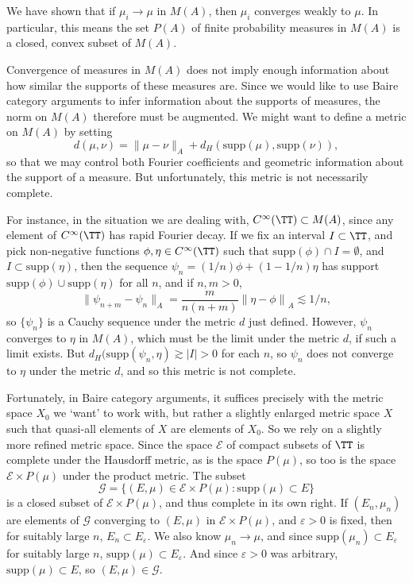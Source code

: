 \begin{remark}
	We have shown that if $\mu_i \to \mu$ in $M(A)$, then $\mu_i$ converges weakly to $\mu$. In particular, this means the set $P(A)$ of finite probability measures in $M(A)$ is a closed, convex subset of $M(A)$.
\end{remark}

Convergence of measures in $M(A)$ does not imply enough information about how similar the supports of these measures are. Since we would like to use Baire category arguments to infer information about the supports of measures, the norm on $M(A)$ therefore must be augmented. We might want to define a metric on $M(A)$ by setting
%
\[ d(\mu,\nu) = \| \mu - \nu \|_A + d_H(\text{supp}(\mu), \text{supp}(\nu)), \]
%
so that we may control both Fourier coefficients and geometric information about the support of a measure. But unfortunately, this metric is not necessarily complete.

\begin{example}
	For instance, in the situation we are dealing with, $C^\infty(\TT) \subset M(A)$, since any element of $C^\infty(\TT)$ has rapid Fourier decay. If we fix an interval $I \subset \TT$, and pick non-negative functions $\phi, \eta \in C^\infty(\TT)$ such that $\text{supp}(\phi) \cap I = \emptyset$, and $I \subset \text{supp}(\eta)$, then the sequence $\psi_n = (1/n) \phi + (1 - 1/n) \eta$ has support $\text{supp}(\phi) \cup \text{supp}(\eta)$ for all $n$, and if $n,m > 0$,
	\[ \| \psi_{n + m} - \psi_n \|_A = \frac{m}{n(n+m)} \left\| \eta - \phi \right\|_A \lesssim 1/n, \]
	so $\{ \psi_n \}$ is a Cauchy sequence under the metric $d$ just defined. However, $\psi_n$ converges to $\eta$ in $M(A)$, which must be the limit under the metric $d$, if such a limit exists. But $d_H(\text{supp}(\psi_n, \eta) \gtrsim |I| > 0$ for each $n$, so $\psi_n$ does not converge to $\eta$ under the metric $d$, and so this metric is not complete.
\end{example}

Fortunately, in Baire category arguments, it suffices precisely with the metric space $X_0$ we `want' to work with, but rather a slightly enlarged metric space $X$ such that quasi-all elements of $X$ are elements of $X_0$. So we rely on a slightly more refined metric space. Since the space $\mathcal{E}$ of compact subsets of $\TT$ is complete under the Hausdorff metric, as is the space $P(\mu)$, so too is the space $\mathcal{E} \times P(\mu)$ under the product metric. The subset
%
\[ \mathcal{G} = \{ (E,\mu) \in \mathcal{E} \times P(\mu): \text{supp}(\mu) \subset E \} \]
%
is a closed subset of $\mathcal{E} \times P(\mu)$, and thus complete in its own right. If $(E_n,\mu_n)$ are elements of $\mathcal{G}$ converging to $(E,\mu)$ in $\mathcal{E} \times P(\mu)$, and $\varepsilon > 0$ is fixed, then for suitably large $n$, $E_n \subset E_\varepsilon$. We also know $\mu_n \to \mu$, and since $\text{supp}(\mu_n) \subset E_\varepsilon$ for suitably large $n$, $\text{supp}(\mu) \subset E_\varepsilon$. And since $\varepsilon > 0$ was arbitrary, $\text{supp}(\mu) \subset E$, so $(E,\mu) \in \mathcal{G}$.

